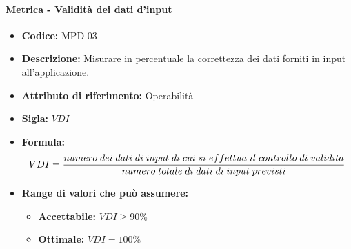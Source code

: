 	 \paragraph{Metrica - Validità dei dati d'input} 
	    \begin{itemize}
          \item  \textbf{Codice: } MPD-03
           \item \textbf{Descrizione:} Misurare in percentuale la correttezza dei dati forniti in input all'applicazione.
         \item   \textbf{Attributo di riferimento:} Operabilità
          \item  \textbf{Sigla:} $VDI$
         \item   \textbf{Formula:} $$VDI = {numero \; dei \; dati \; di \; input \; di \; cui \; si \; effettua \; il \; controllo \; di \; validita \over numero \; totale \; di \; dati \; di \; input \; previsti}$$
             
        \item \textbf{Range di valori che può assumere:}
        \begin{itemize}
            \item \textbf{Accettabile:} $VDI \geq 90\%$
            \item \textbf{Ottimale:} $VDI = 100\%$
        \end{itemize}
       \end{itemize}
              
                
